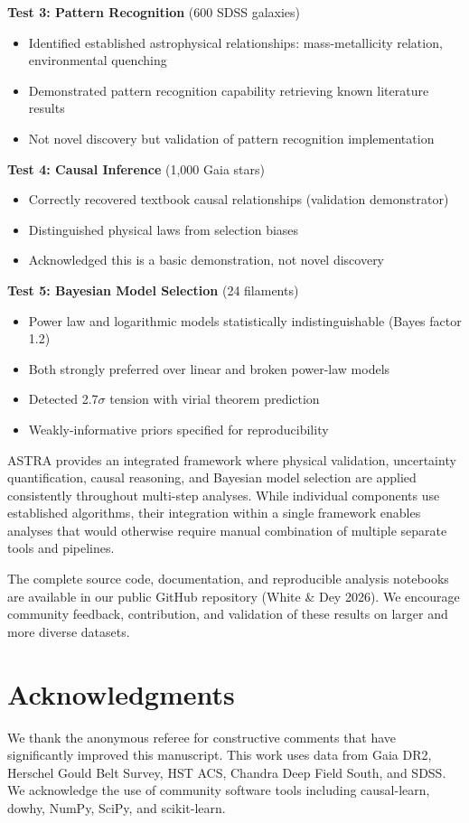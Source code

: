 \documentclass[usenatbib]{rasti}
\begin{document}
\textbf{Test 3: Pattern Recognition} (600 SDSS galaxies)
\begin{itemize}
\item Identified established astrophysical relationships: mass-metallicity relation, environmental quenching
\item Demonstrated pattern recognition capability retrieving known literature results
\item Not novel discovery but validation of pattern recognition implementation
\end{itemize}

\textbf{Test 4: Causal Inference} (1,000 Gaia stars)
\begin{itemize}
\item Correctly recovered textbook causal relationships (validation demonstrator)
\item Distinguished physical laws from selection biases
\item Acknowledged this is a basic demonstration, not novel discovery
\end{itemize}

\textbf{Test 5: Bayesian Model Selection} (24 filaments)
\begin{itemize}
\item Power law and logarithmic models statistically indistinguishable (Bayes factor 1.2)
\item Both strongly preferred over linear and broken power-law models
\item Detected 2.7$\sigma$ tension with virial theorem prediction
\item Weakly-informative priors specified for reproducibility
\end{itemize}

ASTRA provides an integrated framework where physical validation, uncertainty quantification, causal reasoning, and Bayesian model selection are applied consistently throughout multi-step analyses. While individual components use established algorithms, their integration within a single framework enables analyses that would otherwise require manual combination of multiple separate tools and pipelines.

The complete source code, documentation, and reproducible analysis notebooks are available in our public GitHub repository (White \& Dey 2026)\cite{astra_github}. We encourage community feedback, contribution, and validation of these results on larger and more diverse datasets.

\section*{Acknowledgments}

We thank the anonymous referee for constructive comments that have significantly improved this manuscript. This work uses data from Gaia DR2, Herschel Gould Belt Survey, HST ACS, Chandra Deep Field South, and SDSS. We acknowledge the use of community software tools including causal-learn, dowhy, NumPy, SciPy, and scikit-learn.

\label{lastpage}



\end{document}

